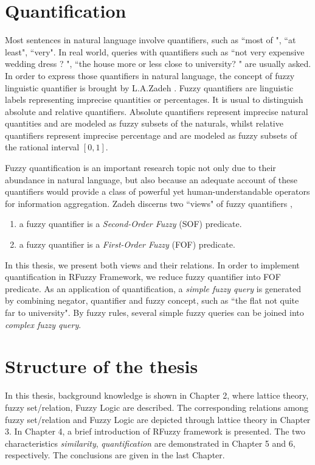 \documentclass[Thesis.tex]{subfiles}
\begin{document}
\section{Quantification}
Most sentences in natural language involve quantifiers, such as ``most of ", ``at least", ``very".  In real world, queries with quantifiers such as ``not very expensive wedding dress ? ", ``the house more or less close to university? " are usually asked. In order to express those quantifiers in natural language, the concept of fuzzy linguistic quantifier is brought by L.A.Zadeh \cite{Z83}. Fuzzy quantifiers  are linguistic labels representing imprecise quantities or percentages. It is usual to distinguish absolute and relative quantifiers. Absolute quantifiers represent imprecise natural quantities and are modeled as fuzzy subsets of the naturals, whilst relative quantifiers represent imprecise percentage and are modeled as fuzzy subsets of the rational interval $[0,1]$.
 
Fuzzy quantification is an important research topic not only due to their abundance in natural language, but also because an adequate account of these quantifiers would provide a class of powerful yet human-understandable operators for information aggregation. Zadeh discerns two ``views" of fuzzy quantifiers \cite{Z83},
\begin{enumerate}
\item a fuzzy quantifier is a \textit{Second-Order Fuzzy} (SOF) predicate.
\item a fuzzy quantifier is a \textit{First-Order Fuzzy} (FOF) predicate.
\end{enumerate}

In this thesis, we present both views and their relations. In order to implement quantification in RFuzzy Framework, we reduce fuzzy quantifier into FOF predicate. As an application of quantification, a \textit{simple fuzzy query} is generated by combining negator, quantifier and fuzzy concept, such as ``the flat not quite far to university". By fuzzy rules, several simple fuzzy queries can be joined into \textit{complex fuzzy query}.

\section{Structure of the thesis}
In this thesis, background knowledge is shown in Chapter 2, where lattice theory, fuzzy set/relation, Fuzzy Logic are described. The corresponding relations among fuzzy set/relation and Fuzzy Logic are depicted through lattice theory in Chapter 3. In Chapter 4,  a brief introduction of RFuzzy framework is presented.  The two characteristics \textit{similarity}, \textit{quantification} are demonstrated in Chapter 5 and 6, respectively. The conclusions are given in the last Chapter.
\end{document}
